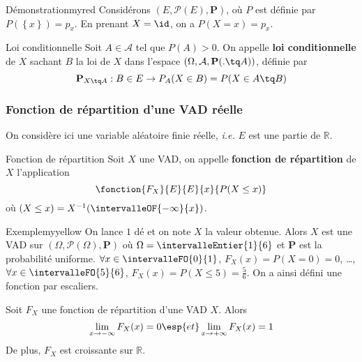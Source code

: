     \begin{demo}{Démonstration}{myred}
        Considérons $(E, \mathcal{P}(E), \mathbf{P})$, où $P$ est définie par $P(\left\{x\right\}) = p_x$. En prenant $X = \id$, on a $P(X = x) = p_x$.
    \end{demo}

    \begin{defi}{Loi conditionnelle}{}
        Soit $A \in \mathcal{A}$ tel que $P(A) > 0$. On appelle \textbf{loi conditionnelle} de $X$ sachant $B$ la loi de $X$ dans l’espace $(\Omega, \mathcal{A}, \mathbf{P}(. \tq A))$, définie par 
        \[ \mathbf{P}_{X \tq A} : B \in E \to P_A(X \in B) = P(X \in A \tq B) \]    
    \end{defi}

    \subsubsection{Fonction de répartition d’une VAD réelle}

    On considère ici une variable aléatoire finie réelle, \textit{i.e.} $E$ est une partie de $\mathbb{R}$.

    \begin{defi}{Fonction de répartition}{}
        Soit $X$ une VAD, on appelle \textbf{fonction de répartition} de $X$ l’application 
        \[ \fonction{F_X}{E}{E}{x}{P(X \leq x)} \] 
        où $(X \leq x) = X^{-1}(\intervalleOF{-\infty}{x})$.
    \end{defi}

    \begin{omed}{Exemple}{myyellow}
        On lance $1$ dé et on note $X$ la valeur obtenue. Alors $X$ est une VAD sur $(\Omega, \mathcal{P}(\Omega), \mathbf{P})$ où $\Omega = \intervalleEntier{1}{6}$ et $\mathbf{P}$ est la probabilité uniforme. $\forall x \in \intervalleFO{0}{1}$, $F_X(x) = P(X = 0) = 0$, \ldots, $\forall x \in \intervalleFO{5}{6}$, $F_X(x) = P(X \leq 5) = \frac{5}{6}$. On a ainsi défini une fonction par escaliers.
    \end{omed}

    \begin{prop}{}{}
        Soit $F_X$ une fonction de répartition d’une VAD $X$. Alors 
        \[ \lim_{x \to -\infty} F_X(x) = 0 \esp{et} \lim_{x \to +\infty} F_X(x) = 1 \]    
        De plus, $F_X$ est croissante sur $\mathbb{R}$.
    \end{prop}

